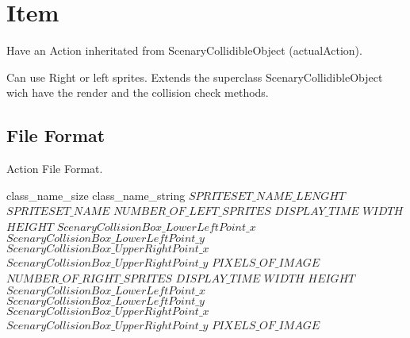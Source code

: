 \chapter{Item}

	Have an Action inheritated from ScenaryCollidibleObject (actualAction).
	
	Can use Right or left sprites. Extends the superclass ScenaryCollidibleObject wich have the render and the collision check methods.
	
	
	
	\section{File Format}
	  
	  \begin{algorithm}[H]
	      \caption{Action File Format.}
	      \label{algoEvalCuda}
	      \begin{algorithmic}
		  \STATE [int] class\_name\_size
		  \STATE [byte] class\_name\_string
		  \STATE [int]$SPRITESET\_NAME\_LENGHT$
		  \STATE [byte*]$SPRITESET\_NAME$
		  \STATE [int]$NUMBER\_OF\_LEFT\_SPRITES$
		      \STATE [double]$DISPLAY\_TIME$
		      \STATE [int] $WIDTH$
		      \STATE [int] $HEIGHT$
			  \STATE [double] $ScenaryCollisionBox\_LowerLeftPoint\_x$
			  \STATE [double] $ScenaryCollisionBox\_LowerLeftPoint\_y$
			  \STATE [double] $ScenaryCollisionBox\_UpperRightPoint\_x$
			  \STATE [double] $ScenaryCollisionBox\_UpperRightPoint\_y$
		      \STATE [int*] $PIXELS\_OF\_IMAGE$
		  \ENDFOR
		  \STATE [int]$NUMBER\_OF\_RIGHT\_SPRITES$
		      \STATE [double]$DISPLAY\_TIME$
		      \STATE [int] $WIDTH$
		      \STATE [int] $HEIGHT$
			  \STATE [double] $ScenaryCollisionBox\_LowerLeftPoint\_x$
			  \STATE [double] $ScenaryCollisionBox\_LowerLeftPoint\_y$
			  \STATE [double] $ScenaryCollisionBox\_UpperRightPoint\_x$
			  \STATE [double] $ScenaryCollisionBox\_UpperRightPoint\_y$
		      \STATE [int*] $PIXELS\_OF\_IMAGE$
		  \ENDFOR
		  \end{algorithmic}
	  \end{algorithm}